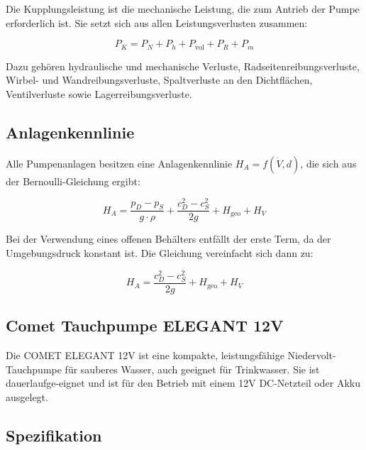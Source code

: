 Die Kupplungsleistung ist die mechanische Leistung, die zum Antrieb der Pumpe erforderlich ist. Sie setzt sich aus allen Leistungsverlusten zusammen:

\begin{equation}
	P_K = P_N + P_h + P_{\text{vol}} + P_R + P_m
\end{equation}

Dazu gehören hydraulische und mechanische Verluste, Radseitenreibungsverluste, Wirbel- und Wandreibungsverluste, Spaltverluste an den Dichtflächen, Ventilverluste sowie Lagerreibungsverluste.

\subsection*{Anlagenkennlinie}

Alle Pumpenanlagen besitzen eine Anlagenkennlinie \( H_A = f(\dot{V}, d) \), die sich aus der Bernoulli-Gleichung ergibt:

\begin{equation}
	H_A = \frac{p_D - p_S}{g \cdot \rho} + \frac{c_D^2 - c_S^2}{2g} + H_{\text{geo}} + H_V
\end{equation}

Bei der Verwendung eines offenen Behälters entfällt der erste Term, da der Umgebungsdruck konstant ist. Die Gleichung vereinfacht sich dann zu:

\begin{equation}
	H_A = \frac{c_D^2 - c_S^2}{2g} + H_{\text{geo}} + H_V
\end{equation}
\cite{Surek:2021}


\subsection{Comet Tauchpumpe ELEGANT 12V }
Die COMET ELEGANT 12V ist eine kompakte, leistungsfähige Niedervolt-Tauchpumpe für sauberes Wasser, auch geeignet für Trinkwasser. Sie ist dauerlaufge-eignet und ist für den Betrieb mit einem 12V DC-Netzteil oder Akku ausgelegt. \cite{Comet:2004} \cite{ConradPumpe:2025}

\subsection{Spezifikation}
